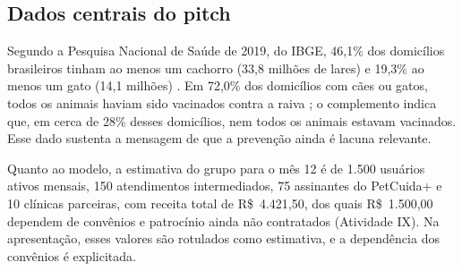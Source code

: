 \subsection{Dados centrais do pitch}

Segundo a Pesquisa Nacional de Saúde de 2019, do IBGE, 46,1\% dos domicílios brasileiros tinham ao menos um cachorro (33,8 milhões de lares) e 19,3\% ao menos um gato (14,1 milhões) \cite{correio2020}. Em 72,0\% dos domicílios com cães ou gatos, todos os animais haviam sido vacinados contra a raiva \cite{conexaoto2020}; o complemento indica que, em cerca de 28\% desses domicílios, nem todos os animais estavam vacinados. Esse dado sustenta a mensagem de que a prevenção ainda é lacuna relevante.

Quanto ao modelo, a estimativa do grupo para o mês 12 é de 1.500 usuários ativos mensais, 150 atendimentos intermediados, 75 assinantes do PetCuida+ e 10 clínicas parceiras, com receita total de R\$~4.421,50, dos quais R\$~1.500,00 dependem de convênios e patrocínio ainda não contratados (Atividade IX). Na apresentação, esses valores são rotulados como estimativa, e a dependência dos convênios é explicitada.
